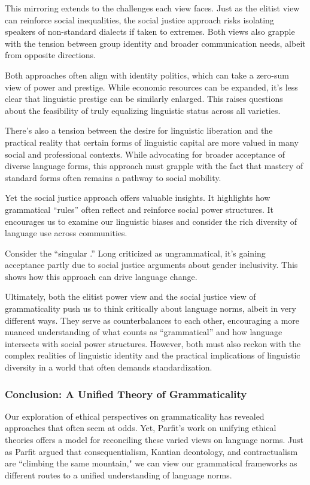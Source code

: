 This mirroring extends to the challenges each view faces. Just as the elitist view can reinforce social inequalities, the social justice approach risks isolating speakers of non-standard dialects if taken to extremes. Both views also grapple with the tension between group identity and broader communication needs, albeit from opposite directions.

Both approaches often align with identity politics, which can take a zero-sum view of power and prestige. While economic resources can be expanded, it's less clear that linguistic prestige can be similarly enlarged. This raises questions about the feasibility of truly equalizing linguistic status across all varieties.

There's also a tension between the desire for linguistic liberation and the practical reality that certain forms of linguistic capital are more valued in many social and professional contexts. While advocating for broader acceptance of diverse language forms, this approach must grapple with the fact that mastery of standard forms often remains a pathway to social mobility.

Yet the social justice approach offers valuable insights. It highlights how grammatical ``rules'' often reflect and reinforce social power structures. It encourages us to examine our linguistic biases and consider the rich diversity of language use across communities.

Consider the ``singular .'' Long criticized as ungrammatical, it's gaining acceptance partly due to social justice arguments about gender inclusivity. This shows how this approach can drive language change.

Ultimately, both the elitist power view and the social justice view of grammaticality push us to think critically about language norms, albeit in very different ways. They serve as counterbalances to each other, encouraging a more nuanced understanding of what counts as ``grammatical'' and how language intersects with social power structures. However, both must also reckon with the complex realities of linguistic identity and the practical implications of linguistic diversity in a world that often demands standardization.

\subsubsection{Conclusion: A Unified Theory of Grammaticality}

Our exploration of ethical perspectives on grammaticality has revealed approaches that often seem at odds. Yet, Parfit's work on unifying ethical theories offers a model for reconciling these varied views on language norms. Just as Parfit argued that consequentialism, Kantian deontology, and contractualism are ``climbing the same mountain," we can view our grammatical frameworks as different routes to a unified understanding of language norms.

